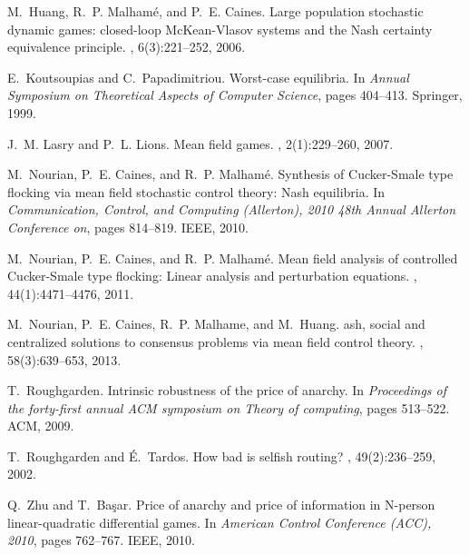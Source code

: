 \documentclass[11pt]{article}
\begin{document}
\begin{thebibliography}{10}
M.~Huang, R.~P. Malham{\'e}, and P.~E. Caines.
\newblock Large population stochastic dynamic games: closed-loop
  {M}c{K}ean-{V}lasov systems and the {N}ash certainty equivalence principle.
, 6(3):221--252, 2006.

E.~Koutsoupias and C.~Papadimitriou.
\newblock Worst-case equilibria.
\newblock In {\em Annual Symposium on Theoretical Aspects of Computer Science},
  pages 404--413. Springer, 1999.

J.~M. Lasry and P.~L. Lions.
\newblock Mean field games.
, 2(1):229--260, 2007.

M.~Nourian, P.~E. Caines, and R.~P. Malham{\'e}.
\newblock Synthesis of {C}ucker-{S}male type flocking via mean field stochastic
  control theory: {N}ash equilibria.
\newblock In {\em Communication, Control, and Computing (Allerton), 2010 48th
  Annual Allerton Conference on}, pages 814--819. IEEE, 2010.

M.~Nourian, P.~E. Caines, and R.~P. Malham{\'e}.
\newblock Mean field analysis of controlled {C}ucker-{S}male type flocking:
  Linear analysis and perturbation equations.
, 44(1):4471--4476, 2011.

M.~Nourian, P.~E. Caines, R.~P. Malhame, and M.~Huang.
ash, social and centralized solutions to consensus problems via
  mean field control theory.
, 58(3):639--653, 2013.

T.~Roughgarden.
\newblock Intrinsic robustness of the price of anarchy.
\newblock In {\em Proceedings of the forty-first annual ACM symposium on Theory
  of computing}, pages 513--522. ACM, 2009.

T.~Roughgarden and {\'E}.~Tardos.
\newblock How bad is selfish routing?
, 49(2):236--259, 2002.

Q.~Zhu and T.~Ba{\c{s}}ar.
\newblock Price of anarchy and price of information in {N}-person
  linear-quadratic differential games.
\newblock In {\em American Control Conference (ACC), 2010}, pages 762--767.
  IEEE, 2010.

\end{thebibliography}
\end{document}
